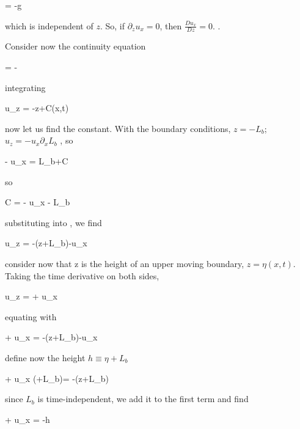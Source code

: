 \beq
{} = -g 
\eeq

which is independent of $z$. So, if $\partial_z u_x=0$, then
$\frac{Du_x}{Dz}=0$. .


Consider now the continuity equation

\beq
{} = - 
\eeq

integrating

\beq
u_z = -z+C(x,t) 
\label{eq:uz-shallow}
\eeq

now let us find the constant. With the boundary conditions, $z=-L_b$;
$u_z = - u_x\partial_x L_b$ , so 

\beq
- u_x = L_b+C
\eeq

so

\beq
C = - u_x - L_b
\label{eq:const-shallow}
\eeq

substituting  into , we find

\beq
u_z = -\left(z+L_b\right)-u_x
\label{eq:uz2-shallow}
\eeq


consider now that z is the height of an upper moving boundary,
$z=\eta(x,t)$. Taking the time derivative on both sides,

\beq
u_z =   + u_x
\label{eq:advect-uz}
\eeq

equating \label{eq:advect-uz} with \label{eq:uz2-shallow}

\beq
  + u_x = -\left(z+L_b\right)-u_x
\eeq

define now the height $h\equiv \eta + L_b$

\beq
  + u_x \left(\eta+L_b\right)= -\left(z+L_b\right)
\eeq

since $L_b$ is time-independent, we add it to the first term and find

\beq
  + u_x = -h
\label{eq:shallow-continuity}
\eeq

